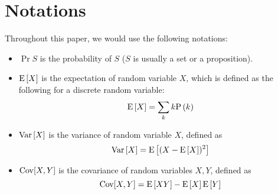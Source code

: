 
\section*{Notations}
Throughout this paper, we would use the following notations:
\begin{itemize}
	\item $\Pr{S}$ is the probability of $S$ ($S$ is usually a set or a
		proposition).
	\item $\text{E}\left[X\right]$ is the expectation of random variable $X$, which is defined
		as the following for a discrete random variable:
		\begin{equation*}
			\E{X} = \sum_k k\P{k}
		\end{equation*}
	\item $\text{Var}\left[X\right]$ is the variance of random variable $X$, defined as
		\begin{equation*}
			\text{Var}\left[X\right] = \text{E}\left[(X-\text{E}\left[X\right])^2\right]
		\end{equation*}
	\item $\operatorname{Cov}[X,Y]$ is the covariance of random variables $X, Y$, defined as
		\begin{equation*}
			\operatorname{Cov}[X,Y] = \text{E}\left[XY\right]-\text{E}\left[X\right]\text{E}\left[Y\right]
		\end{equation*}
\end{itemize}


